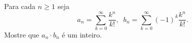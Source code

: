Para cada \(n\geq 1\) seja
\[a_{n}=\sum_{k=0}^{\infty}\frac{k^{n}}{k!}, \;\; b_{n}=\sum_{k=0}^{\infty}(-1)^{k}\frac{k^{n}}{k!}.\] Mostre que \(a_{n}\cdot b_{n}\) é um inteiro.
